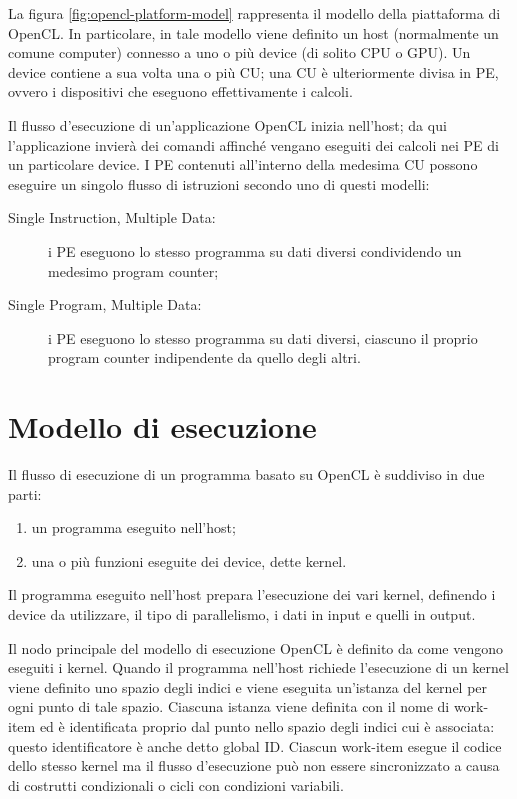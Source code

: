 \documentclass[12pt,a4paper,oneside]{book}
\begin{document}
La figura \ref{fig:opencl-platform-model} rappresenta il modello della piattaforma di \ac{OpenCL}. In particolare, in tale modello viene definito un host (normalmente un comune computer) connesso a uno o più device (di solito \ac{CPU} o \ac{GPU}). Un device contiene a sua volta una o più \ac{CU}; una \ac{CU} è ulteriormente divisa in \ac{PE}, ovvero i dispositivi che eseguono effettivamente i calcoli.

Il flusso d'esecuzione di un'applicazione \ac{OpenCL} inizia nell'host; da qui l'applicazione invierà dei comandi affinché vengano eseguiti dei calcoli nei \ac{PE} di un particolare device. I \ac{PE} contenuti all'interno della medesima \ac{CU} possono eseguire un singolo flusso di istruzioni secondo uno di questi modelli:
\begin{description}
\item[Single Instruction, Multiple Data:] i \ac{PE} eseguono lo stesso programma su dati diversi condividendo un medesimo program counter;
\item[Single Program, Multiple Data:] i \ac{PE} eseguono lo stesso programma su dati diversi, ciascuno il proprio program counter indipendente da quello degli altri.
\end{description}

\section{Modello di esecuzione}
\label{sec:opencl-execution-model}

Il flusso di esecuzione di un programma basato su \ac{OpenCL} è suddiviso in due parti:
\begin{enumerate}
\item un programma eseguito nell'host;
\item una o più funzioni eseguite dei device, dette kernel.
\end{enumerate}

Il programma eseguito nell'host prepara l'esecuzione dei vari kernel, definendo i device da utilizzare, il tipo di parallelismo, i dati in input e quelli in output.

Il nodo principale del modello di esecuzione \ac{OpenCL} è definito da come vengono eseguiti i kernel. Quando il programma nell'host richiede l'esecuzione di un kernel viene definito uno spazio degli indici e viene eseguita un'istanza del kernel per ogni punto di tale spazio. Ciascuna istanza viene definita con il nome di work-item ed è identificata proprio dal punto nello spazio degli indici cui è associata: questo identificatore è anche detto global ID. Ciascun work-item esegue il codice dello stesso kernel ma il flusso d'esecuzione può non essere sincronizzato a causa di costrutti condizionali o cicli con condizioni variabili.
\end{document}
